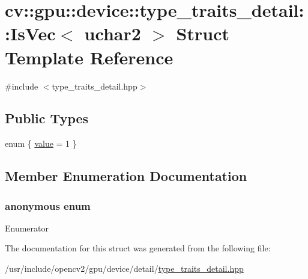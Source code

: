 \hypertarget{structcv_1_1gpu_1_1device_1_1type__traits__detail_1_1IsVec_3_01uchar2_01_4}{\section{cv\-:\-:gpu\-:\-:device\-:\-:type\-\_\-traits\-\_\-detail\-:\-:Is\-Vec$<$ uchar2 $>$ Struct Template Reference}
\label{structcv_1_1gpu_1_1device_1_1type__traits__detail_1_1IsVec_3_01uchar2_01_4}
}


{\ttfamily \#include $<$type\-\_\-traits\-\_\-detail.\-hpp$>$}

\subsection*{Public Types}
\begin{DoxyCompactItemize}
\item 
enum \{ \hyperlink{structcv_1_1gpu_1_1device_1_1type__traits__detail_1_1IsVec_3_01uchar2_01_4_a773aa2c32b6f5bf5691b491432910474a7f297c2005059737c245b95785c5cff2}{value} = 1
 \}
\end{DoxyCompactItemize}


\subsection{Member Enumeration Documentation}
\hypertarget{structcv_1_1gpu_1_1device_1_1type__traits__detail_1_1IsVec_3_01uchar2_01_4_a773aa2c32b6f5bf5691b491432910474}{\subsubsection[{anonymous enum}]{\setlength{\rightskip}{0pt plus 5cm}anonymous enum}}\label{structcv_1_1gpu_1_1device_1_1type__traits__detail_1_1IsVec_3_01uchar2_01_4_a773aa2c32b6f5bf5691b491432910474}
\begin{Desc}
\item[Enumerator]\par
\begin{description}
\item[{\em 
\hypertarget{structcv_1_1gpu_1_1device_1_1type__traits__detail_1_1IsVec_3_01uchar2_01_4_a773aa2c32b6f5bf5691b491432910474a7f297c2005059737c245b95785c5cff2}{value}\label{structcv_1_1gpu_1_1device_1_1type__traits__detail_1_1IsVec_3_01uchar2_01_4_a773aa2c32b6f5bf5691b491432910474a7f297c2005059737c245b95785c5cff2}
}]\end{description}
\end{Desc}


The documentation for this struct was generated from the following file\-:\begin{DoxyCompactItemize}
\item 
/usr/include/opencv2/gpu/device/detail/\hyperlink{type__traits__detail_8hpp}{type\-\_\-traits\-\_\-detail.\-hpp}\end{DoxyCompactItemize}
